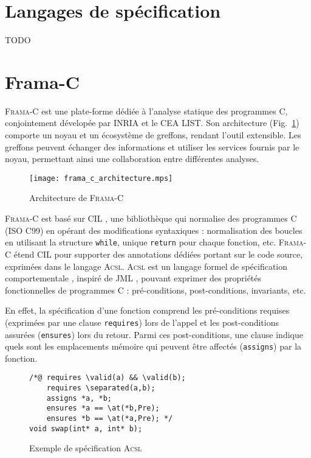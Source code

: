 \documentclass[french]{spimufcphdthesis}
\begin{document}
\section{Langages de spécification}


TODO


\section{Frama-C}


\textsc{Frama-C} \cite{Frama-C} est une plate-forme dédiée à l'analyse statique
des programmes C, conjointement dévelopée par INRIA et le CEA LIST. Son
architecture (Fig.~\ref{fig:archi}) comporte un noyau et un écosystème de
greffons, rendant l’outil extensible. Les greffons peuvent échanger des
informations et utiliser les  services fournis par le noyau, permettant ainsi
une collaboration entre différentes analyses.




\begin{figure}[h]
  \begin{center}
    \texttt{[image: frama\_c\_architecture.mps]}
  \end{center}
  \caption{Architecture de \textsc{Frama-C}}\label{fig:archi}
\end{figure}


\textsc{Frama-C} est basé sur CIL \cite{CIL}, une bibliothèque qui normalise des
programmes C (ISO C99) en opérant des modifications syntaxiques : normalisation
des boucles en utilisant la structure \lstinline{while}, unique
\lstinline{return} pour
chaque fonction, etc. \textsc{Frama-C} étend CIL pour supporter des annotations
dédiées portant sur le code source, exprimées dans le langage \textsc{Acsl}.
\textsc{Acsl} \cite{ACSL} est un langage formel de spécification
comportementale \cite{BISL}, inspiré de JML \cite{JML}, pouvant exprimer des
propriétés fonctionnelles de programmes C : pré-conditions, post-conditions,
invariants, etc.

En effet, la spécification d'une fonction comprend les pré-conditions requises
(exprimées par une clause \lstinline{requires}) lors de l'appel et les
post-conditions assurées (\lstinline{ensures}) lors du retour. Parmi ces
post-conditions, une clause indique quels sont les emplacements mémoire qui
peuvent être affectés (\lstinline{assigns}) par la fonction.


\begin{figure}[h]
\begin{lstlisting}
/*@ requires \valid(a) && \valid(b);
    requires \separated(a,b);
    assigns *a, *b;
    ensures *a == \at(*b,Pre);
    ensures *b == \at(*a,Pre); */
void swap(int* a, int* b);
\end{lstlisting}
\caption{Exemple de spécification \textsc{Acsl}}\label{fig:acsl-spec}
\end{figure}
\end{document}
